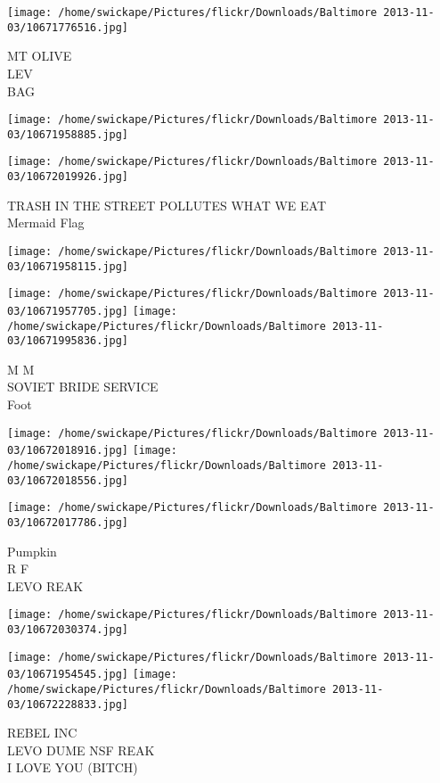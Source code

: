 \documentclass[10pt,letterpaper]{article}
\begin{document}
\vspace{0.25in}
\texttt{[image: /home/swickape/Pictures/flickr/Downloads/Baltimore 2013-11-03/10671776516.jpg]}

MT OLIVE\\
LEV\\
BAG
\pagebreak

\texttt{[image: /home/swickape/Pictures/flickr/Downloads/Baltimore 2013-11-03/10671958885.jpg]}

\vspace{0.25in}
\texttt{[image: /home/swickape/Pictures/flickr/Downloads/Baltimore 2013-11-03/10672019926.jpg]}

TRASH IN THE STREET POLLUTES WHAT WE EAT\\
Mermaid Flag
\pagebreak

\texttt{[image: /home/swickape/Pictures/flickr/Downloads/Baltimore 2013-11-03/10671958115.jpg]}

\vspace{0.25in}
\texttt{[image: /home/swickape/Pictures/flickr/Downloads/Baltimore 2013-11-03/10671957705.jpg]}
\texttt{[image: /home/swickape/Pictures/flickr/Downloads/Baltimore 2013-11-03/10671995836.jpg]}

M M\\
SOVIET BRIDE SERVICE\\
Foot
\pagebreak

\texttt{[image: /home/swickape/Pictures/flickr/Downloads/Baltimore 2013-11-03/10672018916.jpg]}
\texttt{[image: /home/swickape/Pictures/flickr/Downloads/Baltimore 2013-11-03/10672018556.jpg]}

\texttt{[image: /home/swickape/Pictures/flickr/Downloads/Baltimore 2013-11-03/10672017786.jpg]}

Pumpkin\\
R F\\
LEVO REAK
\pagebreak

\texttt{[image: /home/swickape/Pictures/flickr/Downloads/Baltimore 2013-11-03/10672030374.jpg]}

\vspace{0.25in}
\texttt{[image: /home/swickape/Pictures/flickr/Downloads/Baltimore 2013-11-03/10671954545.jpg]}
\texttt{[image: /home/swickape/Pictures/flickr/Downloads/Baltimore 2013-11-03/10672228833.jpg]}

REBEL INC\\
LEVO DUME NSF REAK\\
I LOVE YOU (BITCH)
\pagebreak
\end{document}
